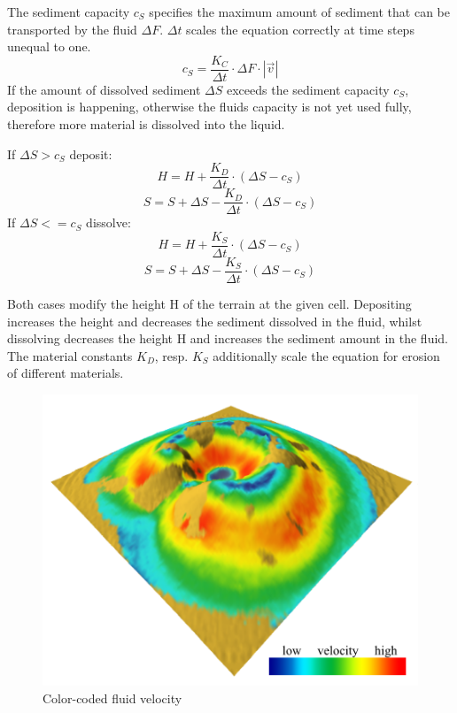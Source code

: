 The sediment capacity $c_S$ specifies the maximum amount of sediment that can be transported by the fluid $\Delta F$. $\Delta t$ scales the equation correctly at time steps unequal to one.  
$$ c_S = \frac{K_C}{\Delta t} \cdot \Delta F  \cdot |\vec{v}|
$$
If the amount of dissolved sediment $\Delta S$ exceeds the sediment capacity $c_S$, deposition is happening, otherwise the fluids capacity is not yet used fully, therefore more material is dissolved into the liquid. 

If $\Delta S > c_S$ deposit: 
$$
H = H + \frac{K_D}{\Delta t} \cdot ( \Delta S - c_S )
$$
$$
S = S + \Delta S - \frac{K_D}{\Delta t} \cdot (\Delta S - c_S)
$$
If $\Delta S <= c_S$ dissolve: 
$$
H = H + \frac{K_S}{\Delta t} \cdot ( \Delta S - c_S )
$$
$$
S = S + \Delta S - \frac{K_S}{\Delta t} \cdot (\Delta S - c_S)
$$

Both cases modify the height H of the terrain at the given cell. Depositing increases the height and decreases the sediment dissolved in the fluid, whilst dissolving decreases the height H and increases the sediment amount in the fluid. The material constants $K_D$, resp. $K_S$ additionally scale the equation for erosion of different materials. 

\begin{figure}
	\centering
	\includegraphics[width=\linewidth]{NWD05/hydraulic_errosion_c}
	\caption{Color-coded fluid velocity}
	\label{fig:calc_acceleration}
\end{figure}

